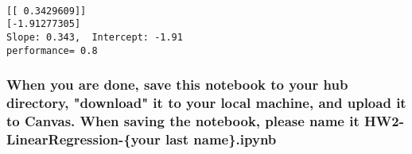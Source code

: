 \documentclass[11pt]{article}
\begin{document}
    \begin{center}
    \end{center}
    { \hspace*{\fill} \\}
    
    \begin{Verbatim}[commandchars=\\\{\}]
[[ 0.3429609]]
[-1.91277305]
Slope: 0.343,  Intercept: -1.91
performance= 0.8

    \end{Verbatim}

    \subsubsection{When you are done, save this notebook to your hub
directory, "download" it to your local machine, and upload it to Canvas.
When saving the notebook, please name it HW2-LinearRegression-\{your
last
name\}.ipynb}\label{when-you-are-done-save-this-notebook-to-your-hub-directory-download-it-to-your-local-machine-and-upload-it-to-canvas.-when-saving-the-notebook-please-name-it-hw2-linearregression-your-last-name.ipynb}


    
    
    
    
\end{document}
